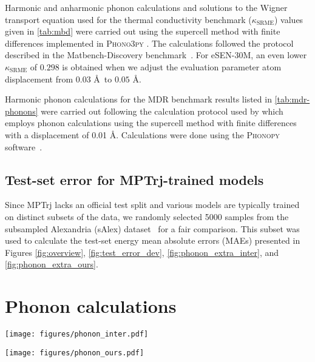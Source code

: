 \documentclass[twocolumn]{fairmeta}
\newcommand{\ourmodel}{eSEN}
\begin{document}
Harmonic and anharmonic phonon calculations and solutions to the Wigner transport equation \citep{simoncelli2022wigner} used for the thermal conductivity benchmark ($\kappa_{\text{SRME}}$) values given in \cref{tab:mbd} were carried out using the supercell method with finite differences implemented in \textsc{Phono3py} \citep{togo2015phono3py, togo2023phonopy}. The calculations followed the protocol described in the Matbench-Discovery benchmark~\citep{riebesell2023matbench, pota2024thermal}. For \ourmodel-30M, an even lower $\kappa_{\mathrm{SRME}}$ of $0.298$ is obtained when we adjust the evaluation parameter atom displacement from $0.03$ \AA\ to $0.05$ \AA.

Harmonic phonon calculations for the MDR benchmark results listed in \cref{tab:mdr-phonons} were carried out following the calculation protocol used by \citep{loew2024universal} which employs phonon calculations using the supercell method with finite differences with a displacement of 0.01 \AA. Calculations were done using the \textsc{Phonopy} software~\cite{togo2023phonopy}.

\subsection{Test-set error for MPTrj-trained models} 

Since MPTrj lacks an official test split and various models are typically trained on distinct subsets of the data, we randomly selected 5000 samples from the subsampled Alexandria (sAlex) dataset~\citep{schmidt2024improving, barroso2024open} for a fair comparison. This subset was used to calculate the test-set energy mean absolute errors (MAEs) presented in Figures \ref{fig:overview}, \ref{fig:test_error_dev}, \ref{fig:phonon_extra_inter}, and \ref{fig:phonon_extra_ours}.

\section{Phonon calculations}\label{appendix:phonons}

\begin{figure*}[t]
\texttt{[image: figures/phonon\_inter.pdf]}
\caption{The correlation between test-set energy error and maximum frequency, free energy and heat capacity across different model architectures.}
\label{fig:phonon_extra_inter}
\end{figure*}

\begin{figure*}[t]
\texttt{[image: figures/phonon\_ours.pdf]}
\caption{The correlation between test-set energy error and maximum frequency, free energy and heat capacity for different variants of \ourmodel.}
\label{fig:phonon_extra_ours}
\end{figure*}
\end{document}

